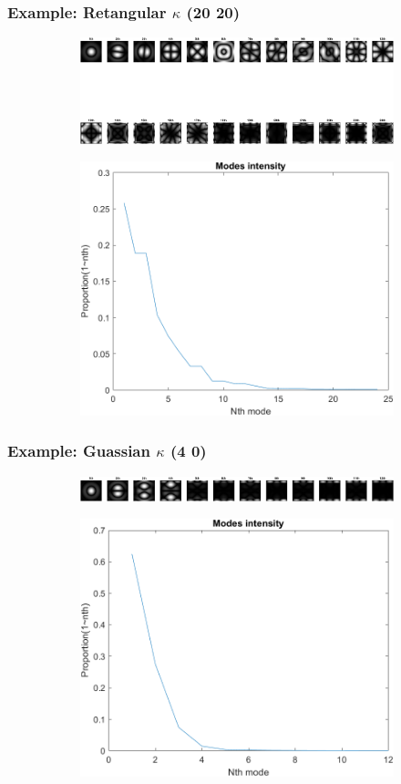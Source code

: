 \documentclass[UTF8]{beamer}
\begin{document}
\begin{frame} \frametitle{Example: Retangular $\kappa$ (20 20)}
\begin{figure}[H]
\centering
\begin{subfigure}{1\textwidth}
    \centering
    \includegraphics[width=0.8\linewidth]{../figures/ex_ave20.png}  
    \label{fig:modes_u}
 \end{subfigure}
 \begin{subfigure}{1\textwidth}
    \centering
    \includegraphics[width=.4\linewidth]{../figures/ex_ave20_s.png}  
    \label{fig:modes_u_phaze}
 \end{subfigure}
 \end{figure}
\end{frame}

\begin{frame} \frametitle{Example: Guassian $\kappa$ (4 0)}
\begin{figure}[H]
\centering
\begin{subfigure}{1\textwidth}
    \centering
    \includegraphics[width=0.8\linewidth]{../figures/ex_gu4_0.png}  
    \label{fig:modes_u}
 \end{subfigure}
 \begin{subfigure}{1\textwidth}
    \centering
    \includegraphics[width=.4\linewidth]{../figures/ex_gu4_0_s.png}  
    \label{fig:modes_u_phaze}
 \end{subfigure}
 \end{figure}
\end{frame}
\end{document}
